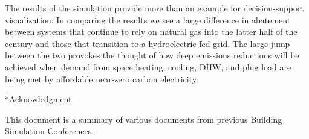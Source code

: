 \documentclass[twocolumn, a4paper,10pt]{article}
\makeatletter
\renewcommand\section{\@startsection{section}{1}{\z@}{3pt}{3pt}{\normalfont\large\bfseries}}
\makeatother
\begin{document}
The results of the simulation provide more than an example for decision-support visualization. In comparing the results we see a large difference in abatement between systems that continue to rely on natural gas into the latter half of the century and those that transition to a hydroelectric fed grid. The large jump between the two provokes the thought of how deep emissions reductions will be achieved when demand from space heating, cooling, DHW, and plug load are being met by affordable near-zero carbon electricity.

\section*{Acknowledgment}


This document is a summary of various documents from previous Building Simulation Conferences.


\end{document}
